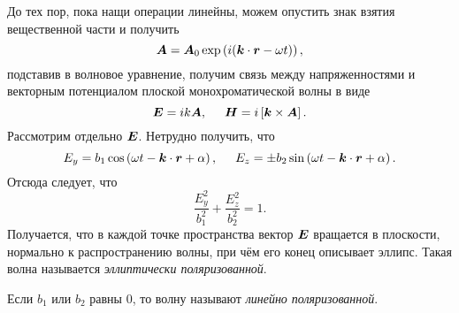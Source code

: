 До тех пор, пока нащи операции линейны, можем опустить знак взятия вещественной части и получить
\begin{equation*}
    \mbox{\boldmath $A$} = \mbox{\boldmath $A$}_0 \exp\left(
        i (\mbox{\boldmath $k$} \cdot \mbox{\boldmath $r$} - \omega t)
    \right),
\end{equation*}
подставив в волновое уравнение, получим связь между напряженностями и векторным потенциалом плоской монохроматической волны в виде
\begin{equation}
    \mbox{\boldmath $E$} = ik \mbox{\boldmath $A$},  \hspace{0.5cm} \mbox{\boldmath $H$} = i \left[\mbox{\boldmath $k$} \times \mbox{\boldmath $A$} \right].
\end{equation}
Рассмотрим отдельно $\mbox{\boldmath $E$}$. Нетрудно получить, что
\begin{equation*}
    E_y = b_1 \cos \left(
        \omega t - \mbox{\boldmath $k$} \cdot \mbox{\boldmath $r$} + \alpha
    \right),
    \hspace{0.5cm} 
    E_z = \pm b_2 \sin \left(
        \omega t - \mbox{\boldmath $k$} \cdot \mbox{\boldmath $r$} + \alpha
    \right).
\end{equation*}
Отсюда следует, что
\begin{equation*}
    \frac{E_y^2}{b_1^2} + \frac{E_z^2}{b_2^2}  = 1.
\end{equation*}
Получается, что в каждой точке пространства вектор $\mbox{\boldmath $E$}$ вращается в плоскости, нормально к распространению волны, при чём его конец описывает эллипс. Такая волна называется \textit{эллиптически поляризованной}. 

Если $b_1$ или $b_2$ равны 0, то волну называют \textit{линейно поляризованной}. 





